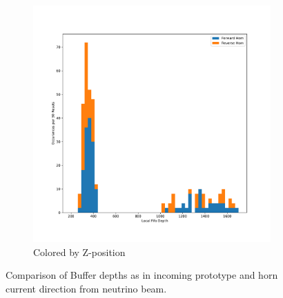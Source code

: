 \begin{figure}
\begin{subfigure}{.5\textwidth}
  \includegraphics[width=\textwidth]{images/df_horn_cut.pdf}
  \caption{Colored by Z-position}
\end{subfigure}
\caption{Comparison of Buffer depths as in incoming prototype and horn current direction from neutrino beam.}
\label{fig:compare_integral_nolabel}
\end{figure}
